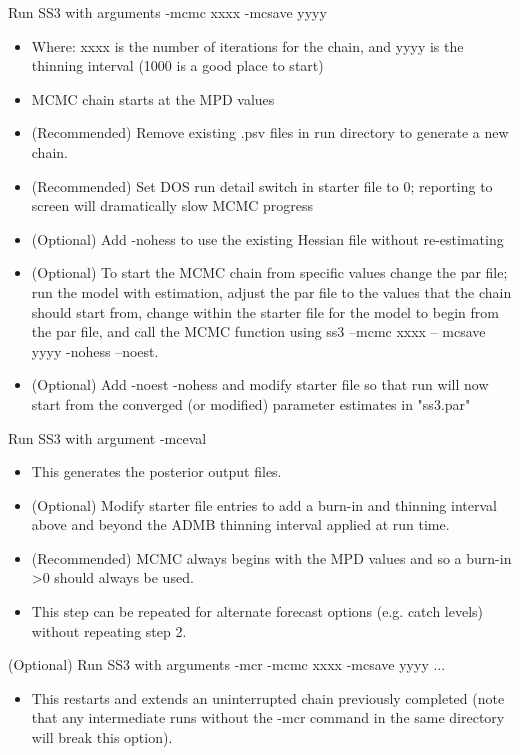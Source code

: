 \noindent Run SS3 with arguments -mcmc xxxx -mcsave yyyy
 \begin{itemize}
 	\item Where: xxxx is the number of iterations for the chain, and yyyy is the thinning interval (1000 is a good place to start)
 	\item MCMC chain starts at the MPD values
 	\item (Recommended) Remove existing .psv files in run directory to generate a new chain.
 	\item (Recommended) Set DOS run detail switch in starter file to 0; reporting to screen will dramatically slow MCMC progress
 	\item (Optional) Add -nohess to use the existing Hessian file without re-estimating
 	\item (Optional) To start the MCMC chain from specific values change the par file; run the model with estimation, adjust the par file to the values that the chain should start from, change within the starter file for the model to begin from the par file, and call the MCMC function using ss3 –mcmc xxxx – mcsave yyyy -nohess –noest.
 	\item (Optional) Add -noest -nohess and modify starter file so that run will now start from the converged (or modified) parameter estimates in "ss3.par"
 \end{itemize}
	
\noindent Run SS3 with argument -mceval
\begin{itemize}
	\item This generates the posterior output files.
	\item (Optional) Modify starter file entries to add a burn-in and thinning interval above and beyond the ADMB thinning interval applied at run time.
	\item (Recommended) MCMC always begins with the MPD values and so a burn-in >0 should always be used.
	\item This step can be repeated for alternate forecast options (e.g. catch levels) without repeating step 2.
\end{itemize}

\noindent (Optional) Run SS3 with arguments -mcr -mcmc xxxx -mcsave yyyy ...
\begin{itemize}
	\item This restarts and extends an uninterrupted chain previously completed (note that any intermediate runs without the -mcr command in the same directory will break this option).
\end{itemize}

